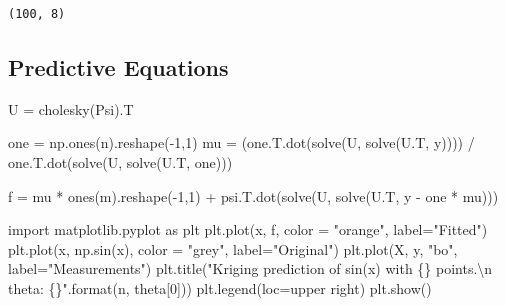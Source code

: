 \documentclass[
  letterpaper,
  DIV=11,
  numbers=noendperiod]{scrreprt}
\newenvironment{Shaded}{\begin{snugshade}}{\end{snugshade}}
\newcommand{\BuiltInTok}[1]{\textcolor[rgb]{0.00,0.23,0.31}{#1}}
\newcommand{\CharTok}[1]{\textcolor[rgb]{0.13,0.47,0.30}{#1}}
\newcommand{\DecValTok}[1]{\textcolor[rgb]{0.68,0.00,0.00}{#1}}
\newcommand{\ImportTok}[1]{\textcolor[rgb]{0.00,0.46,0.62}{#1}}
\newcommand{\NormalTok}[1]{\textcolor[rgb]{0.00,0.23,0.31}{#1}}
\newcommand{\OperatorTok}[1]{\textcolor[rgb]{0.37,0.37,0.37}{#1}}
\newcommand{\SpecialCharTok}[1]{\textcolor[rgb]{0.37,0.37,0.37}{#1}}
\newcommand{\StringTok}[1]{\textcolor[rgb]{0.13,0.47,0.30}{#1}}
\begin{document}
\begin{verbatim}
(100, 8)
\end{verbatim}

\hypertarget{predictive-equations}{%
\subsection{Predictive Equations}\label{predictive-equations}}

\begin{Shaded}
\begin{Highlighting}[]
\NormalTok{U }\OperatorTok{=}\NormalTok{ cholesky(Psi).T}
\end{Highlighting}
\end{Shaded}

\begin{Shaded}
\begin{Highlighting}[]
\NormalTok{one }\OperatorTok{=}\NormalTok{ np.ones(n).reshape(}\OperatorTok{{-}}\DecValTok{1}\NormalTok{,}\DecValTok{1}\NormalTok{)}
\NormalTok{mu }\OperatorTok{=}\NormalTok{ (one.T.dot(solve(U, solve(U.T, y)))) }\OperatorTok{/}\NormalTok{ one.T.dot(solve(U, solve(U.T, one)))}
\end{Highlighting}
\end{Shaded}

\begin{Shaded}
\begin{Highlighting}[]
\NormalTok{f }\OperatorTok{=}\NormalTok{ mu }\OperatorTok{*}\NormalTok{ ones(m).reshape(}\OperatorTok{{-}}\DecValTok{1}\NormalTok{,}\DecValTok{1}\NormalTok{) }\OperatorTok{+}\NormalTok{ psi.T.dot(solve(U, solve(U.T, y }\OperatorTok{{-}}\NormalTok{ one }\OperatorTok{*}\NormalTok{ mu)))}
\end{Highlighting}
\end{Shaded}

\begin{Shaded}
\begin{Highlighting}[]
\ImportTok{import}\NormalTok{ matplotlib.pyplot }\ImportTok{as}\NormalTok{ plt}
\NormalTok{plt.plot(x, f, color }\OperatorTok{=} \StringTok{"orange"}\NormalTok{, label}\OperatorTok{=}\StringTok{"Fitted"}\NormalTok{)}
\NormalTok{plt.plot(x, np.sin(x), color }\OperatorTok{=} \StringTok{"grey"}\NormalTok{, label}\OperatorTok{=}\StringTok{"Original"}\NormalTok{)}
\NormalTok{plt.plot(X, y, }\StringTok{"bo"}\NormalTok{, label}\OperatorTok{=}\StringTok{"Measurements"}\NormalTok{)}
\NormalTok{plt.title(}\StringTok{"Kriging prediction of sin(x) with }\SpecialCharTok{\{\}}\StringTok{ points.}\CharTok{\textbackslash{}n}\StringTok{ theta: }\SpecialCharTok{\{\}}\StringTok{"}\NormalTok{.}\BuiltInTok{format}\NormalTok{(n, theta[}\DecValTok{0}\NormalTok{]))}
\NormalTok{plt.legend(loc}\OperatorTok{=}\StringTok{\textquotesingle{}upper right\textquotesingle{}}\NormalTok{)}
\NormalTok{plt.show()}
\end{Highlighting}
\end{Shaded}
\end{document}
